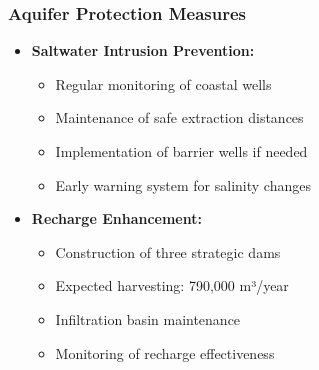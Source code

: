 \subsubsection{Aquifer Protection Measures}
\begin{itemize}
    \item \textbf{Saltwater Intrusion Prevention:}
    \begin{itemize}
        \item Regular monitoring of coastal wells
        \item Maintenance of safe extraction distances
        \item Implementation of barrier wells if needed
        \item Early warning system for salinity changes
    \end{itemize}
    
    \item \textbf{Recharge Enhancement:}
    \begin{itemize}
        \item Construction of three strategic dams
        \item Expected harvesting: 790,000 m³/year
        \item Infiltration basin maintenance
        \item Monitoring of recharge effectiveness
    \end{itemize}
\end{itemize}
